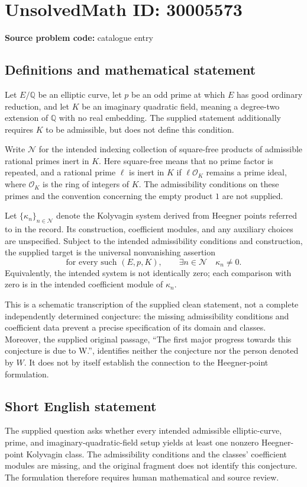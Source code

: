\documentclass[11pt]{article}
\newcommand{\Q}{\mathbb{Q}}
\begin{document}
\section*{UnsolvedMath ID: 30005573}
\textbf{Source problem code:} catalogue entry
\subsection{Definitions and mathematical statement}
Let \(E/\Q\) be an elliptic curve, let \(p\) be an odd prime at which \(E\) has good ordinary reduction, and let \(K\) be an imaginary quadratic field, meaning a degree-two extension of \(\Q\) with no real embedding. The supplied statement additionally requires \(K\) to be admissible, but does not define this condition.

Write \(\mathcal N\) for the intended indexing collection of square-free products of admissible rational primes inert in \(K\). Here square-free means that no prime factor is repeated, and a rational prime \(\ell\) is inert in \(K\) if \(\ell\mathcal O_K\) remains a prime ideal, where \(\mathcal O_K\) is the ring of integers of \(K\). The admissibility conditions on these primes and the convention concerning the empty product \(1\) are not supplied.

Let \(\{\kappa_n\}_{n\in\mathcal N}\) denote the Kolyvagin system derived from Heegner points referred to in the record. Its construction, coefficient modules, and any auxiliary choices are unspecified. Subject to the intended admissibility conditions and construction, the supplied target is the universal nonvanishing assertion
\[
\text{for every such }(E,p,K),\qquad
\exists n\in\mathcal N\quad \kappa_n\ne 0.
\]
Equivalently, the intended system is not identically zero; each comparison with zero is in the intended coefficient module of \(\kappa_n\).

This is a schematic transcription of the supplied clean statement, not a complete independently determined conjecture: the missing admissibility conditions and coefficient data prevent a precise specification of its domain and classes. Moreover, the supplied original passage, ``The ﬁrst major progress towards this conjecture is due to W.'', identifies neither the conjecture nor the person denoted by \(W\). It does not by itself establish the connection to the Heegner-point formulation.
\subsection{Short English statement}
The supplied question asks whether every intended admissible elliptic-curve, prime, and imaginary-quadratic-field setup yields at least one nonzero Heegner-point Kolyvagin class. The admissibility conditions and the classes' coefficient modules are missing, and the original fragment does not identify this conjecture. The formulation therefore requires human mathematical and source review.
\end{document}
